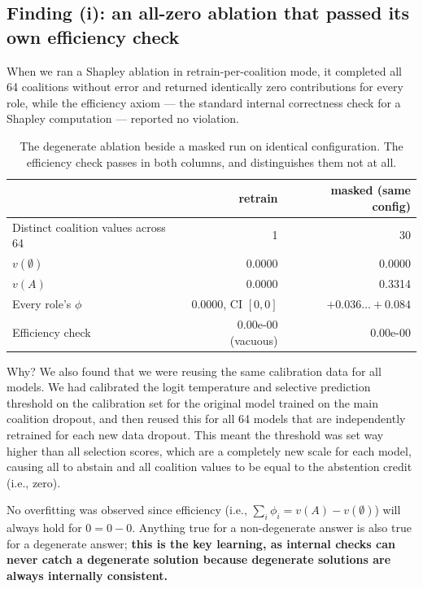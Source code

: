 \subsection{Finding (i): an all-zero ablation that passed its own efficiency check}

When we ran a Shapley ablation in retrain-per-coalition mode, it completed all 64 coalitions without
error and returned identically zero contributions for every role, while the efficiency axiom --- the
standard internal correctness check for a Shapley computation --- reported no violation.

\begin{table}[h]
\centering
\small
\begin{tabular}{lrr}
\toprule
 & retrain & masked (same config) \\
\midrule
Distinct coalition values across 64 & 1 & 30 \\
$v(\emptyset)$ & 0.0000 & 0.0000 \\
$v(A)$ & 0.0000 & 0.3314 \\
Every role's $\phi$ & 0.0000, CI $[0, 0]$ & $+0.036 \ldots +0.084$ \\
Efficiency check & 0.00e-00 (vacuous) & 0.00e-00 \\
\bottomrule
\end{tabular}
\caption{The degenerate ablation beside a masked run on identical configuration. The efficiency check
passes in both columns, and distinguishes them not at all.}
\label{tab:degenerate}
\end{table}

Why? We also found that we were reusing the same calibration data for all models. We had calibrated
the logit temperature and selective prediction threshold on the calibration set for the original
model trained on the main coalition dropout, and then reused this for all 64 models that are
independently retrained for each new data dropout. This meant the threshold was set way higher than
all selection scores, which are a completely new scale for each model, causing all to abstain and all
coalition values to be equal to the abstention credit (i.e., zero).

No overfitting was observed since efficiency (i.e., $\sum_i \phi_i = v(A) - v(\emptyset)$) will
always hold for $0 = 0 - 0$. Anything true for a non-degenerate answer is also true for a degenerate
answer; \textbf{this is the key learning, as internal checks can never catch a degenerate solution
because degenerate solutions are always internally consistent.}

